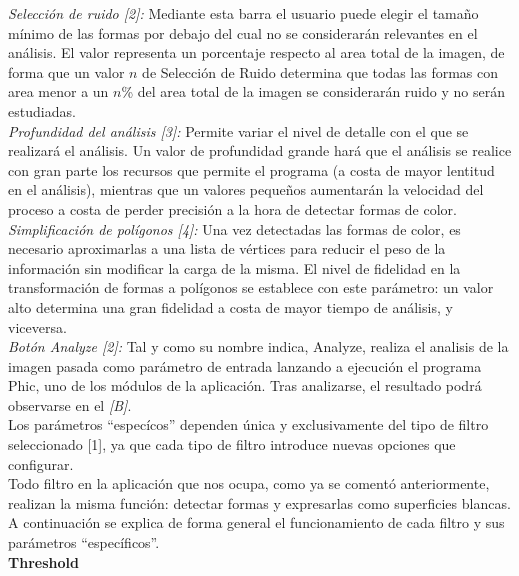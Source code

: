 		\noindent\textit{Selección de ruido [2]:} Mediante esta barra el usuario puede elegir el tamaño mínimo de las formas por debajo del cual no se considerarán relevantes en el análisis. El valor representa un porcentaje respecto al area total de la imagen, de forma que un valor $n$ de Selección de Ruido determina que todas las formas con area menor a un $n$\% del area total de la imagen se considerarán ruido y no serán estudiadas.\\
		
		\noindent\textit{Profundidad del análisis [3]:} Permite variar el nivel de detalle con el que se realizará el análisis. Un valor de profundidad grande hará que el análisis se realice con gran parte los recursos que permite el programa (a costa de mayor lentitud en el análisis), mientras que un valores pequeños aumentarán la velocidad del proceso a costa de perder precisión a la hora de detectar formas de color.\\
		
		\noindent\textit{Simplificación de polígonos [4]:} Una vez detectadas las formas de color, es necesario aproximarlas a una lista de vértices para reducir el peso de la información sin modificar la carga de la misma. El nivel de fidelidad en la transformación de formas a polígonos se establece con este parámetro: un valor alto determina una gran fidelidad a costa de mayor tiempo de análisis, y viceversa.\\
		
		\noindent\textit{Botón Analyze [2]:} Tal y como su nombre indica, Analyze, realiza el analisis de la imagen pasada como parámetro de entrada lanzando a ejecución el programa Phic, uno de los módulos de la aplicación. Tras analizarse, el resultado podrá observarse en el \textit{[B]}.\\


		Los parámetros ``especícos'' dependen única y exclusivamente del tipo de filtro seleccionado [1], ya que cada tipo de filtro introduce nuevas opciones que configurar. \\
		
		
		Todo filtro en la aplicación que nos ocupa, como ya se comentó anteriormente, realizan la misma función: detectar formas y expresarlas como superficies blancas. A continuación se explica de forma general el funcionamiento de cada filtro y sus parámetros ``específicos''.\\
		
	\noindent\textbf{Threshold}\\
		
